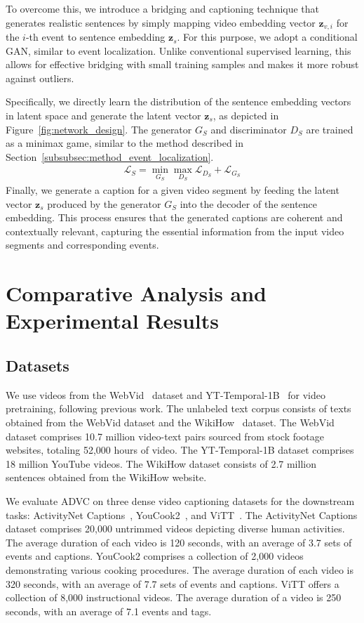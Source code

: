 To overcome this, we introduce a bridging and captioning technique that generates realistic sentences by simply mapping video embedding vector $\bm{z}_{v,i}$ for the $i$-th event to sentence embedding $\bm{z}_s$.
For this purpose, we adopt a conditional GAN, similar to event localization.
Unlike conventional supervised learning, this allows for effective bridging with small training samples and makes it more robust against outliers.

Specifically, we directly learn the distribution of the sentence embedding vectors in latent space and generate the latent vector $\bm{z}_s$, as depicted in Figure~\ref{fig:network_design}.
The generator $G_S$ and discriminator $D_S$ are trained as a minimax game, similar to the method described in Section~\ref{subsubsec:method_event_localization}.
\begin{equation}
    \begin{aligned}
        \mathcal{L}_{S} = \min_{G_S} \max_{D_S} \mathcal{L}_{D_S} + \mathcal{L}_{G_S}
    \end{aligned}
\end{equation}
Finally, we generate a caption for a given video segment by feeding the latent vector $\bm{z}_s$ produced by the generator $G_S$ into the decoder of the sentence embedding.
This process ensures that the generated captions are coherent and contextually relevant, capturing the essential information from the input video segments and corresponding events.

\section{Comparative Analysis and Experimental Results}

\subsection{Datasets}
We use videos from the WebVid~\cite{Bain2021-si} dataset and YT-Temp\discretionary{-}{}{}oral-1B~\cite{Zellers2022-zr} for video pretraining, following previous work.
The unlabeled text corpus consists of texts obtained from the WebVid dataset and the WikiHow~\cite{Koupaee2018-et} dataset.
The WebVid dataset comprises 10.7 million video-text pairs sourced from stock footage websites, totaling 52,000 hours of video.
The YT-Temporal-1B dataset comprises 18 million YouTube videos.
The WikiHow dataset consists of 2.7 million sentences obtained from the WikiHow website.

We evaluate ADVC on three dense video captioning datasets for the downstream tasks: ActivityNet Captions~\cite{Krishna2017-pw}, You\discretionary{-}{}{}Cook2~\cite{Zhou2018-eq}, and ViTT~\cite{Huang2020-as}.
The ActivityNet Captions dataset comprises 20,000 untrimmed videos depicting diverse human activities.
The average duration of each video is 120 seconds, with an average of 3.7 sets of events and captions.
YouCook2 comprises a collection of 2,000 videos demonstrating various cooking procedures.
The average duration of each video is 320 seconds, with an average of 7.7 sets of events and captions.
ViTT offers a collection of 8,000 instructional videos.
The average duration of a video is 250 seconds, with an average of 7.1 events and tags.

